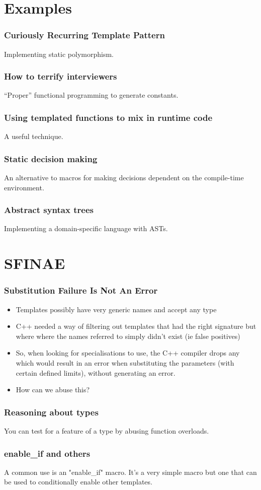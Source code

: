 \documentclass{beamer}
\begin{document}
  \section{Examples}
  \begin{frame}
    \frametitle{Curiously Recurring Template Pattern}
    \pause
    Implementing static polymorphism.
  \end{frame}
  \begin{frame}
    \frametitle{How to terrify interviewers}
    \pause
    ``Proper'' functional programming to generate constants.
  \end{frame}
  \begin{frame}
    \frametitle{Using templated functions to mix in runtime code}
    \pause
    A useful technique.
  \end{frame}
  \begin{frame}
    \frametitle{Static decision making}
    \pause
    An alternative to macros for making decisions dependent on the compile-time
    environment.
  \end{frame}
  \begin{frame}
    \frametitle{Abstract syntax trees}
    \pause
    Implementing a domain-specific language with ASTs.
  \end{frame}
  \section{SFINAE}
  \begin{frame}
    \frametitle{Substitution Failure Is Not An Error}
    \begin{itemize}
      \pause
      \item Templates possibly have very generic names and accept any type
      \pause
      \item C++ needed a way of filtering out templates that had the right
        signature but where where the names referred to simply didn't exist (ie
        false positives)
      \pause
      \item So, when looking for specialisations to use, the C++ compiler drops
        any which would result in an error when substituting the parameters
        (with certain defined limits), without generating an error.
      \pause
      \item How can we abuse this?
    \end{itemize}
  \end{frame}
  \begin{frame}
    \frametitle{Reasoning about types}
    \pause
    You can test for a feature of a type by abusing function overloads.
  \end{frame}
  \begin{frame}
    \frametitle{enable\_if and others}
    \pause
    A common use is an "enable\_if" macro. It's a very simple macro but one
    that can be used to conditionally enable other templates.
  \end{frame}
\end{document}
